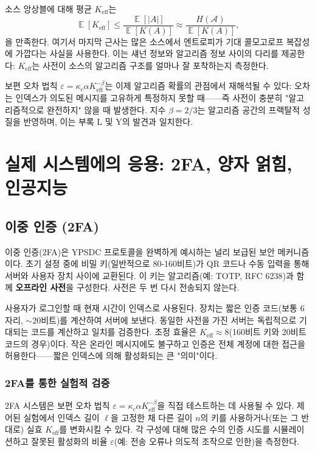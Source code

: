 \documentclass[12pt,a4paper]{article}
\newcommand{\Keff}{K_{\mathrm{eff}}}
\DeclareMathOperator{\E}{\mathbb{E}}
\begin{document}
	소스 앙상블에 대해 평균 $\Keff$는
	\begin{equation}
		\E[\Keff] \le \frac{\E[|A|]}{\E[K(A)]} \approx \frac{H(\mathcal{A})}{\E[K(A)]},
	\end{equation}
	을 만족한다. 여기서 마지막 근사는 많은 소스에서 엔트로피가 기대 콜모고로프 복잡성에 가깝다는 사실을 사용한다. 이는 섀넌 정보와 알고리즘 정보 사이의 다리를 제공한다: $\Keff$는 사전이 소스의 알고리즘 구조를 얼마나 잘 포착하는지 측정한다.
	
	보편 오차 법칙 $\varepsilon = \kappa_c \alpha K_{\mathrm{eff}}^{-\beta}$는 이제 알고리즘 확률의 관점에서 재해석될 수 있다: 오차는 인덱스가 의도된 메시지를 고유하게 특정하지 못할 때——즉 사전이 충분히 "알고리즘적으로 완전하지" 않을 때 발생한다. 지수 $\beta = 2/3$는 알고리즘 공간의 프랙탈적 성질을 반영하며, 이는 부록 L 및 Y의 발견과 일치한다.
	
	\section{실제 시스템에의 응용: 2FA, 양자 얽힘, 인공지능}
	\label{sec:applications}
	
	\subsection{이중 인증 (2FA)}
	
	이중 인증(2FA)은 YPSDC 프로토콜을 완벽하게 예시하는 널리 보급된 보안 메커니즘이다. 초기 설정 중에 비밀 키(일반적으로 80-160비트)가 QR 코드나 수동 입력을 통해 서버와 사용자 장치 사이에 교환된다. 이 키는 알고리즘(예: TOTP, RFC 6238)과 함께 \textbf{오프라인 사전}을 구성한다. 사전은 두 번 다시 전송되지 않는다.
	
	사용자가 로그인할 때 현재 시간이 인덱스로 사용된다. 장치는 짧은 인증 코드(보통 6자리, $\sim 20$비트)를 계산하여 서버에 보낸다. 동일한 사전을 가진 서버는 독립적으로 기대되는 코드를 계산하고 일치를 검증한다. 조정 효율은 $\Keff \approx 8$(160비트 키와 20비트 코드의 경우)이다. 작은 온라인 메시지에도 불구하고 인증은 전체 계정에 대한 접근을 허용한다——짧은 인덱스에 의해 활성화되는 큰 "의미"이다.
	
	\subsubsection{2FA를 통한 실험적 검증}
	\label{subsec:2fa-experiment}
	
	2FA 시스템은 보편 오차 법칙 $\varepsilon = \kappa_c \alpha K_{\mathrm{eff}}^{-\beta}$을 직접 테스트하는 데 사용될 수 있다. 제어된 실험에서 인덱스 길이 $\ell$을 고정한 채 다른 길이 $n$의 키를 사용하거나(또는 그 반대로) 실효 $\Keff$를 변화시킬 수 있다. 각 구성에 대해 많은 수의 인증 시도를 시뮬레이션하고 잘못된 활성화의 비율 $\varepsilon$(예: 전송 오류나 의도적 조작으로 인한)을 측정한다.
	
\end{document}
